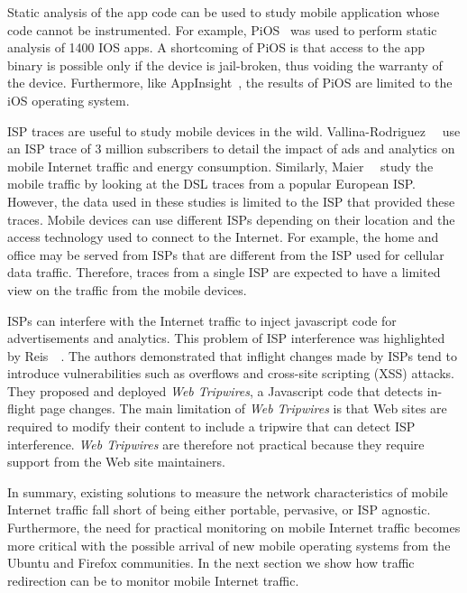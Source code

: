 Static analysis of the app code can be used to study mobile application whose code cannot be instrumented. 
For example, PiOS~\cite{egele:pios} was used to perform static analysis of 1400 IOS apps. 
A shortcoming of PiOS is that access to the app binary is possible only if the device is jail-broken, thus voiding the warranty of the device.
Furthermore, like AppInsight~\cite{ravindranath:appinsight}, the results of PiOS are limited to the iOS operating system. 

ISP traces are useful to study mobile devices in the wild. 
Vallina-Rodriguez~\etal~\cite{vallina-rod:ads} use an ISP trace of 3 million subscribers to detail the impact of ads and analytics on mobile Internet traffic and energy consumption. 
Similarly, Maier~\etal~\cite{maier:mobtraffic} study the mobile traffic by looking at the DSL traces from a popular European ISP. 
However, the data used in these studies is limited to the ISP that provided these traces.
Mobile devices can use different ISPs depending on their location and the access technology used to connect to the Internet. 
For example, the home \wifi and office \wifi may be served from ISPs that are different from the ISP used for cellular data traffic.
Therefore, traces from a single ISP are expected to have a limited view on the traffic from the mobile devices.

ISPs can interfere with the Internet traffic to inject javascript code for advertisements and analytics.
This problem of ISP interference was highlighted by Reis~\etal~\cite{reis:tripwires}. 
The authors demonstrated that inflight changes made by ISPs tend to introduce vulnerabilities such as overflows and cross-site scripting (XSS) attacks. 
They proposed and deployed \emph{Web Tripwires}, a Javascript code that detects in-flight page changes. 
The main limitation of \emph{Web Tripwires} is that Web sites are required to modify their content to include a tripwire that can detect ISP interference. 
\emph{Web Tripwires} are therefore not practical because they require support from the Web site maintainers. 

In summary, existing solutions to measure the network characteristics of mobile Internet traffic fall short of being either portable, pervasive, or ISP agnostic. 
Furthermore, the need for practical monitoring on mobile Internet traffic becomes more critical with the possible arrival of new mobile operating systems from the Ubuntu and Firefox communities.
In the next section we show how traffic redirection can be to monitor mobile Internet traffic. 



